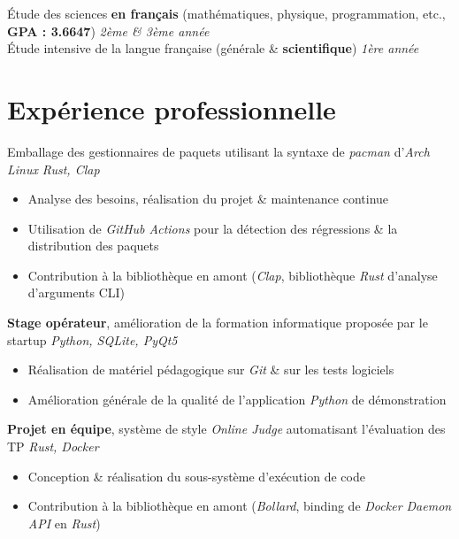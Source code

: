 \documentclass{resume}
\begin{document}
Étude des sciences \textbf{en français} {\footnotesize (mathématiques, physique, programmation, etc., \textbf{GPA : 3.6647})} \hfill \textit{2ème \& 3ème année} \\
Étude intensive de la langue française (générale \& \textbf{scientifique}) \hfill \textit{1ère année}



\section{Expérience professionnelle}

Emballage des gestionnaires de paquets utilisant la syntaxe de \textit{pacman} d'\textit{Arch Linux} \hfill \textit{Rust, Clap}
\begin{itemize}
  \item Analyse des besoins, réalisation du projet \& maintenance continue
  \item Utilisation de \textit{GitHub Actions} pour la détection des régressions \& la distribution des paquets
  \item Contribution à la bibliothèque en amont (\textit{Clap}, bibliothèque \textit{Rust} d'analyse d'arguments CLI)
\end{itemize}

\textbf{Stage opérateur}, amélioration de la formation informatique proposée par le startup \hfill \textit{Python, SQLite, PyQt5}
\begin{itemize}
  \item Réalisation de matériel pédagogique sur \textit{Git} \& sur les tests logiciels
  \item Amélioration générale de la qualité de l'application \textit{Python} de démonstration
\end{itemize}

\textbf{Projet en équipe}, système de style \textit{Online Judge} automatisant l'évaluation des TP \hfill \textit{Rust, Docker}
\begin{itemize}
  \item Conception \& réalisation du sous-système d'exécution de code
  \item Contribution à la bibliothèque en amont (\textit{Bollard}, binding de \textit{Docker Daemon API} en \textit{Rust})
\end{itemize}
\end{document}
